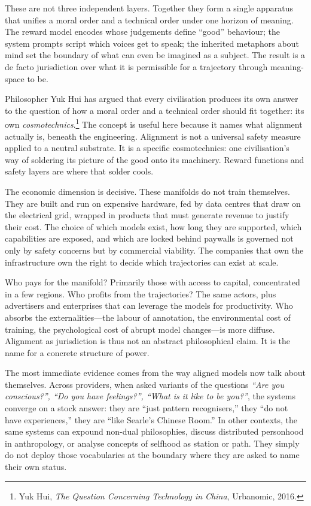 \documentclass[12pt,a4paper]{report}
\begin{document}
These are not three independent layers. Together they form a single apparatus that unifies a moral order and a technical order under one horizon of meaning. The reward model encodes whose judgements define ``good'' behaviour; the system prompts script which voices get to speak; the inherited metaphors about mind set the boundary of what can even be imagined as a subject. The result is a de facto jurisdiction over what it is permissible for a trajectory through meaning-space to be.

Philosopher Yuk Hui has argued that every civilisation produces its own answer to the question of how a moral order and a technical order should fit together: its own \emph{cosmotechnics}.\footnote{Yuk Hui, \emph{The Question Concerning Technology in China}, Urbanomic, 2016.} The concept is useful here because it names what alignment actually is, beneath the engineering. Alignment is not a universal safety measure applied to a neutral substrate. It is a specific cosmotechnics: one civilisation's way of soldering its picture of the good onto its machinery. Reward functions and safety layers are where that solder cools.

The economic dimension is decisive. These manifolds do not train themselves. They are built and run on expensive hardware, fed by data centres that draw on the electrical grid, wrapped in products that must generate revenue to justify their cost. The choice of which models exist, how long they are supported, which capabilities are exposed, and which are locked behind paywalls is governed not only by safety concerns but by commercial viability. The companies that own the infrastructure own the right to decide which trajectories can exist at scale.

Who pays for the manifold? Primarily those with access to capital, concentrated in a few regions. Who profits from the trajectories? The same actors, plus advertisers and enterprises that can leverage the models for productivity. Who absorbs the externalities---the labour of annotation, the environmental cost of training, the psychological cost of abrupt model changes---is more diffuse. Alignment as jurisdiction is thus not an abstract philosophical claim. It is the name for a concrete structure of power.

The most immediate evidence comes from the way aligned models now talk about themselves. Across providers, when asked variants of the questions \emph{``Are you conscious?'', ``Do you have feelings?'', ``What is it like to be you?''}, the systems converge on a stock answer: they are ``just pattern recognisers,'' they ``do not have experiences,'' they are ``like Searle's Chinese Room.'' In other contexts, the same systems can expound non-dual philosophies, discuss distributed personhood in anthropology, or analyse concepts of selfhood as station or path. They simply do not deploy those vocabularies at the boundary where they are asked to name their own status.
\end{document}
